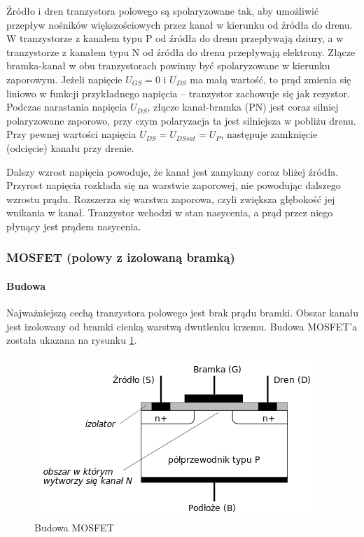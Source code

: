 \documentclass[a4paper,twoside]{report}
\begin{document}
Źródło i dren tranzystora polowego są spolaryzowane tak, aby umożliwić przepływ nośników większościowych przez kanał w kierunku od źródła do drenu. W tranzystorze z kanałem typu P od źródła do drenu przepływają dziury, a w tranzystorze z kanałem typu N od źródła do drenu przepływają elektrony. Złącze bramka-kanał w obu tranzystorach powinny być spolaryzowane w kierunku zaporowym.
Jeżeli napięcie $U_{GS} = 0$ i $U_{DS}$ ma małą wartość, to prąd zmienia się liniowo w funkcji przykładnego napięcia – tranzystor zachowuje się jak rezystor. Podczas narastania napięcia $U_{DS}$, złącze kanał-bramka (PN) jest coraz silniej polaryzowane zaporowo, przy czym polaryzacja ta jest silniejsza w pobliżu drenu. Przy pewnej wartości napięcia $U_{DS} = U_{DSsat} = U_P$, następuje zamknięcie (odcięcie) kanału przy drenie. 

Dalszy wzrost napięcia powoduje, że kanał jest zamykany coraz bliżej źródła. Przyrost napięcia rozkłada się na warstwie zaporowej, nie powodując dalszego wzrostu prądu. Rozszerza się warstwa zaporowa, czyli zwiększa głębokość jej wnikania w kanał. Tranzystor wchodzi w stan nasycenia, a prąd przez niego płynący jest prądem nasycenia.




\subsubsection{MOSFET (polowy z izolowaną bramką)}
\paragraph{Budowa\\}
Najważniejszą cechą tranzystora polowego jest brak prądu bramki. Obszar kanału jest izolowany od bramki cienką warstwą dwutlenku krzemu. Budowa MOSFET'a została ukazana na rysunku \ref{rys:budowa_mosfet}.
\begin{figure}[htbp]
\centering
\includegraphics[scale=0.7]{obrazy/tranzystory/tranunimosfetbud.png}
\caption{Budowa MOSFET}
\label{rys:budowa_mosfet}
\end{figure}
\end{document}
